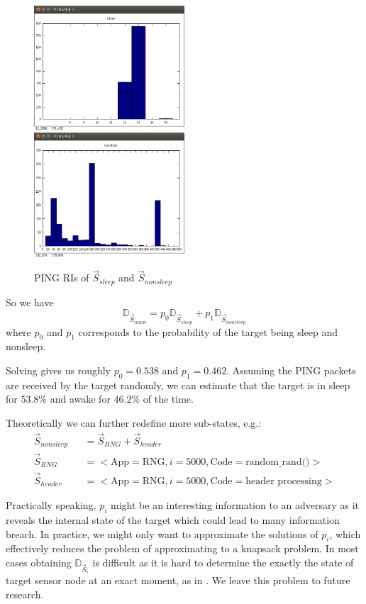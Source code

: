 \begin{example}
\begin{figure}
\includegraphics[width=0.5\textwidth]{fig/d_sleep.png}
\includegraphics[width=0.5\textwidth]{fig/d_nonsleep.png}
\caption{PING RIs of $\vec{S}_{sleep}$ and $\vec{S}_{nonsleep}$}
\label{Fig: s_sleep and s_nonsleep}
\end{figure}

So we have
\begin{equation} \label{Eq: sleep}
\mathbb{D}_{\vec{S}_{main}} = p_0 \mathbb{D}_{\vec{S}_{sleep}} + p_1 \mathbb{D}_{\vec{S}_{nonsleep}}
\end{equation}
where $p_0$ and $p_1$ corresponds to the probability of the target being sleep and nonsleep.

Solving  gives us roughly $p_0 = 0.538$ and $p_1 = 0.462$. Assuming the PING packets are received by the target randomly, we can estimate that the target is in sleep for $53.8\%$ and awake for $46.2\%$ of the time.

Theoretically we can further redefine more sub-states, e.g.:
\begin{eqnarray*}
\vec{S}_{nonsleep} &&= \vec{S}_{RNG} + \vec{S}_{header} \\
\vec{S}_{RNG} &&= <\text{App} = \text{RNG}, i = 5000, \text{Code} = \text{random\_rand()}> \\
\vec{S}_{header} &&= <\text{App} = \text{RNG}, i = 5000, \text{Code} = \text{header processing}> 
\end{eqnarray*}
\end{example}

Practically speaking, $p_i$ might be an interesting information to an  adversary as it reveals the internal state of the target which could lead to many information breach.  In practice, we might only want to approximate the solutions of $p_i$, which effectively reduces the problem of approximating  to a knapsack problem\cite{knapsack}. In most cases obtaining $\mathbb{D}_{\vec{S}_i}$ is difficult as it is hard to determine the exactly the state of target sensor node at an exact moment, as in . We leave this problem to future research.
